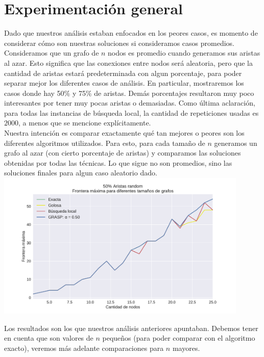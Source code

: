 \section{Experimentación general}

Dado que nuestros análisis estaban enfocados en los peores casos, es momento de considerar cómo son nuestras soluciones si consideramos casos promedios.  \\

Consideramos que un grafo de $n$ nodos es promedio cuando generamos sus aristas al azar. Esto significa que las conexiones entre nodos será aleatoria, pero que la cantidad de aristas estará predeterminada con algun porcentaje, para poder separar mejor los diferentes casos de análisis. En particular, mostraremos los casos donde hay 50\% y 75\% de aristas. Demás porcentajes resultaron muy poco interesantes por tener muy pocas aristas o demasiadas. Como última aclaración, para todas las instancias de búsqueda local, la cantidad de repeticiones usadas es $2000$, a menos que se mencione explícitamente. \\

Nuestra intención es comparar exactamente qué tan mejores o peores son los diferentes algoritmos utilizados. Para esto, para cada tamaño de $n$ generamos un grafo al azar (con cierto porcentaje de aristas) y comparamos las soluciones obtenidas por todas las técnicas. Lo que sigue no son promedios, sino las soluciones finales para algun caso aleatorio dado. \\

{\centering
    \includegraphics[width=0.9\textwidth]{informe/imgs/exp_random50_frontera_todos_v2.pdf}
}
$ $ \newline

Los resultados son los que nuestros análisis anteriores apuntaban. Debemos tener en cuenta que son valores de $n$ pequeños (para poder comparar con el algoritmo exacto), veremos más adelante comparaciones para $n$ mayores. \\

